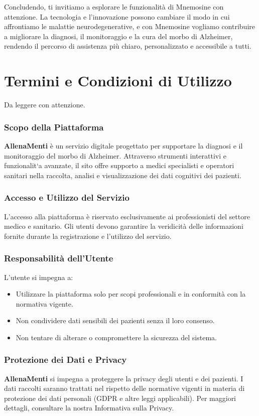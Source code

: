 \documentclass[a4paper,12pt]{book}
\begin{document}
	Concludendo, ti invitiamo a esplorare le funzionalità di Mnemosine con attenzione. La tecnologia e l'innovazione possono cambiare il modo in cui affrontiamo le malattie neurodegenerative, e con Mnemosine vogliamo contribuire a migliorare la diagnosi, il monitoraggio e la cura del morbo di Alzheimer, rendendo il percorso di assistenza più chiaro, personalizzato e accessibile a tutti.
	
	\chapter{Termini e Condizioni di Utilizzo}
	Da leggere con attenzione.
	
	\subsection{Scopo della Piattaforma}
	\textbf{AllenaMenti} è un servizio digitale progettato per supportare la diagnosi e il monitoraggio del morbo di Alzheimer. Attraverso strumenti interattivi e funzionalit`a avanzate, il sito offre supporto a medici specialisti e operatori sanitari nella raccolta, analisi e visualizzazione dei dati cognitivi dei pazienti.
	
	\subsection{Accesso e Utilizzo del Servizio}
	L'accesso alla piattaforma è riservato esclusivamente ai professionisti del settore medico e sanitario. Gli utenti devono garantire la veridicità delle informazioni fornite durante la registrazione e l'utilizzo del servizio.
	
	\subsection{Responsabilità dell'Utente}
	L'utente si impegna a:
	\begin{itemize}
		\item Utilizzare la piattaforma solo per scopi professionali e in conformità con la normativa vigente.
		\item Non condividere dati sensibili dei pazienti senza il loro consenso.
		\item Non tentare di alterare o compromettere la sicurezza del sistema.
	\end{itemize}
	
	\subsection{Protezione dei Dati e Privacy}
	\textbf{AllenaMenti} si impegna a proteggere la privacy degli utenti e dei pazienti. I dati raccolti saranno trattati nel rispetto delle normative vigenti in materia di protezione dei dati personali (GDPR e altre leggi applicabili). Per maggiori dettagli, consultare la nostra Informativa sulla Privacy.
	
\end{document}
